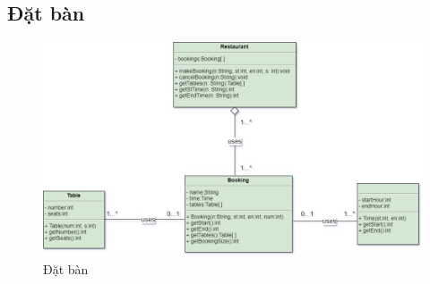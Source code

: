 \newpage
\subsection{Đặt bàn}

\begin{figure}[!h]
    \begin{center}
        \includegraphics[scale=0.5]{Images/ClassDiagram/booking.jpg}
    \end{center}
    \hspace{0.3cm}
    \caption{Đặt bàn}
\end{figure}
